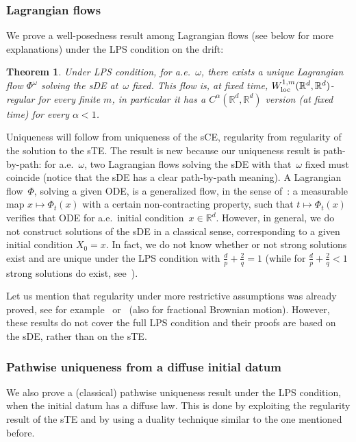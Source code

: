 \documentclass[a4paper,10pt]{article}
\newtheorem{theorem}{Theorem}[section]
\newcommand\1{\mathbbm{1}}
\newcommand\loc{{\rm loc}}
\numberwithin{equation}{section}
\begin{document}
\subsubsection{Lagrangian flows}

We prove a well-posedness result among Lagrangian flows (see below for more explanations) under the LPS condition on the drift:

\begin{theorem}
Under LPS condition, for a.e.~$\omega$, there exists a unique Lagrangian flow $\Phi^\omega$ solving the sDE at~$\omega$ fixed. This flow is, at fixed time, $W_{\loc}^{1,m}(\mathbb{R}^{d},\mathbb{R}^{d})$-regular for every finite $m$, in particular it has a $C^\alpha(\mathbb{R}^{d},\mathbb{R}^{d})$ version \textup{(}at fixed time\textup{)} for every $\alpha<1$.
\end{theorem}

Uniqueness will follow from uniqueness of the sCE, regularity from regularity of the solution to the sTE. The result is new because our uniqueness result is path-by-path: for a.e.~$\omega$, two Lagrangian flows solving the sDE with that~$\omega$ fixed must coincide (notice that the sDE has a clear path-by-path meaning). A Lagrangian flow~$\Phi$, solving a given ODE, is a generalized flow, in the sense of~\cite{DIPELI89,AMBROSIO04}: a measurable map $x\mapsto\Phi_{t}(x)$ with a certain non-contracting property, such that $t\mapsto\Phi_{t}(x)$ verifies that ODE for a.e.~initial condition~$x \in \mathbb{R}^{d}$. However, in general, we do not construct solutions of the sDE in a classical sense, corresponding to a given initial condition $X_{0}=x$. In fact, we do not know whether or not strong solutions exist and are unique under the LPS condition with $\frac{d}{p}+\frac{2}{q}=1$ (while for $\frac {d}{p}+\frac{2}{q}<1$ strong solutions do exist, see~\cite{KRYROE05}).

Let us mention that regularity under more restrictive assumptions was already proved, see for example~\cite{FEDFLA13b,MOHNILPRO15} or~\cite{CATGUB13} (also for fractional Brownian motion). However, these results do not cover the full LPS condition and their proofs are based on the sDE, rather than on the sTE.

\subsubsection{Pathwise uniqueness from a diffuse initial datum}

We also prove a (classical) pathwise uniqueness result under the LPS condition, when the initial datum has a diffuse law. This is done by exploiting the regularity result of the sTE and by using a duality technique similar to the one mentioned before.
\end{document}
